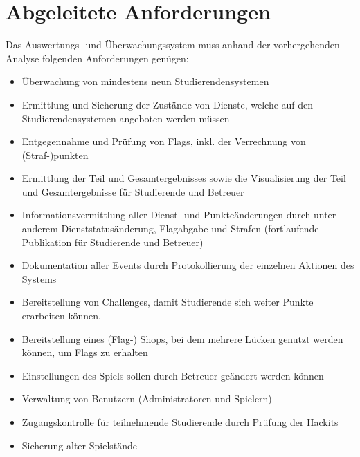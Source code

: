 \section{Abgeleitete Anforderungen}
\label{sec:Abgeleitete_Anforderungen}

Das Auswertungs- und Überwachungssystem muss anhand der vorhergehenden Analyse folgenden Anforderungen genügen:
\begin{itemize}
	\item Überwachung von mindestens neun Studierendensystemen
	\item Ermittlung und Sicherung der Zustände von Dienste, welche auf den Studierendensystemen angeboten werden müssen
	\item Entgegennahme und Prüfung von Flags, inkl. der Verrechnung von (Straf-)punkten
	\item Ermittlung der Teil und Gesamtergebnisses sowie die Visualisierung der Teil und Gesamtergebnisse für Studierende und Betreuer
	\item Informationsvermittlung aller Dienst- und Punkteänderungen durch unter anderem Dienststatusänderung, Flagabgabe und Strafen (fortlaufende Publikation für Studierende und Betreuer)
	\item Dokumentation aller Events durch Protokollierung der einzelnen Aktionen des Systems
	\item Bereitstellung von Challenges, damit Studierende sich weiter Punkte erarbeiten können.
	\item Bereitstellung eines (Flag-) Shops, bei dem mehrere Lücken genutzt werden können, um Flags zu erhalten
	\item Einstellungen des Spiels sollen durch Betreuer geändert werden können
	\item Verwaltung von Benutzern (Administratoren und Spielern)
	\item Zugangskontrolle für teilnehmende Studierende durch Prüfung der Hackits
	\item Sicherung alter Spielstände
\end{itemize}